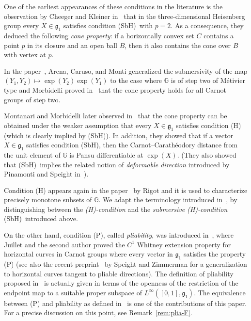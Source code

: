 \documentclass[10pt,a4paper]{amsart}
\numberwithin{equation}{section}
\theoremstyle{definition}
\begin{document}
One of the earliest appearances of these conditions in the literature is the
observation by Cheeger and Kleiner in~\cite{CheegerKleiner} that in the three-dimensional Heisenberg group every $X\in {\mathfrak g}_1$ satisfies
condition (SbH)\ with $p=2$. As a consequence, they deduced the following \emph{cone property}: if a horizontally convex set $C$ contains a point $p$ in its closure and an open ball $B$, then it also contains
the cone over $B$ with vertex at $p$.

In the paper~\cite{ACM}, Arena, Caruso, and Monti generalized the submersivity of the map $(Y_1,Y_2)\mapsto \exp(Y_2) \exp(Y_1)$ to the case where $\mathbb{G}$ is of step two of M\'etivier type and
Morbidelli proved in~\cite{Morbidelli} that the cone property holds for all Carnot groups of step two.

Montanari and Morbidelli later observed
in~\cite{MontanariMorbidelli2021} that the cone property can be obtained
under the weaker assumption
that every $X\in {\mathfrak g}_1$ satisfies condition (H) (which is clearly implied by (SbH)). In addition, they showed that if a vector $X\in {\mathfrak g}_1$ satisfies condition (SbH), then the
Carnot--Carath\'eodory distance from the unit element of $\mathbb{G}$ is Pansu differentiable at $\exp(X)$.
(They also showed that (SbH)\ implies the related
notion of \emph{deformable direction} introduced by Pinamonti and Speight in~\cite{PinamontiSpeight}).

Condition (H) appears again in the paper~\cite{Rigot} by Rigot and it is used to characterize precisely monotone subsets of $\mathbb{G}$. We adapt the terminology introduced in~\cite{Rigot}, by distinguishing between the {\em {\rm (H)}-condition} and the {\em submersive {\rm (H)}-condition} (SbH)\ introduced above.

On the other hand, condition (P), called \emph{pliability}, was introduced
 in~\cite{Juillet-Sigalotti}, where Juillet and the second author proved the $C^1$ Whitney extension property for horizontal curves in Carnot groups where every vector in ${\mathfrak g}_1$ satisfies the property (P) (see also the recent preprint~\cite{SpeightZimmerman} by Speight and Zimmerman for a generalization to horizontal curves tangent to pliable directions).
The definition of pliability proposed in~\cite{Juillet-Sigalotti} is actually given in terms of the openness of the restriction of the endpoint map to a suitable proper subspace of $L^\infty([0,1],\mathfrak{g}_1)$. The equivalence between (P) and pliability as defined in~\cite{Juillet-Sigalotti} is one of the contributions of this paper. For a precise discussion on this point, see Remark~\ref{rem:plia-F}.
\end{document}
